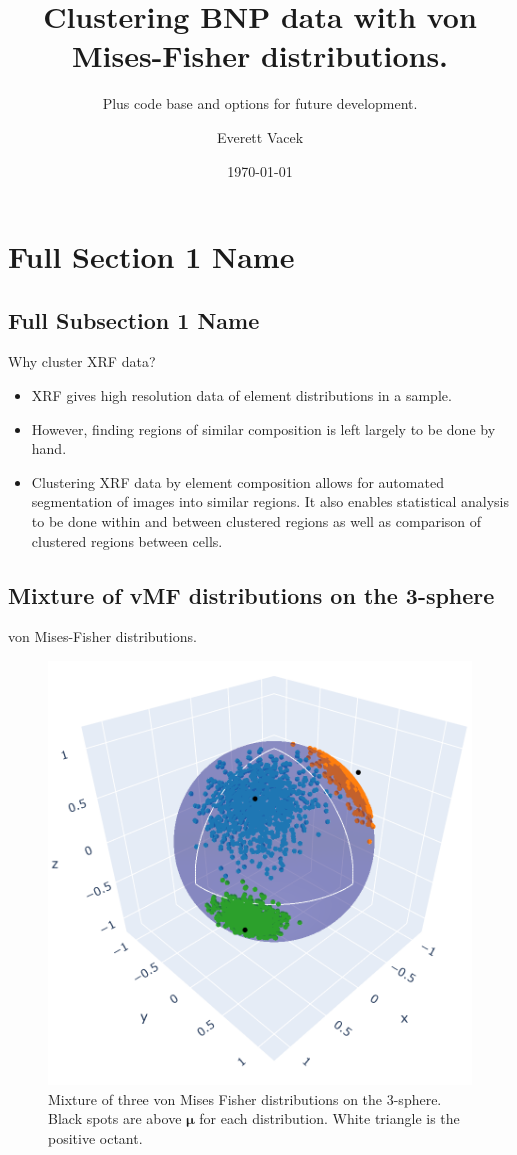 \documentclass[
]{beamer}
\title[Short Presentation Title]{Clustering BNP data with von Mises-Fisher distributions.}
\subtitle[Short Presentation Subtitle]{Plus code base and options for future development.}
\author[E. Vacek]{Everett Vacek}
\date{\today}
\begin{document}
\begin{frame}[plain]
\maketitle
\end{frame}

\section[Short Section 1 Name]{Full Section 1 Name}
\subsection[Short Subsection 1 Name]{Full Subsection 1 Name}

\begin{frame}{Why cluster XRF data?}
    \begin{itemize}
        \item XRF gives high resolution data of element distributions in a sample.
        \item However, finding regions of similar composition is left largely to be done by hand.
        \item Clustering XRF data by element composition allows for automated segmentation of  images into similar regions. It also enables statistical analysis to be done within and between clustered regions as well as comparison of clustered regions between cells.
    \end{itemize}
\end{frame}

\subsection[movMF image]{Mixture of vMF distributions on the 3-sphere}
\begin{frame}{von Mises-Fisher distributions.}
\begin{figure}[h]
  \includegraphics[width=.5\textwidth,height=.5\textheight,keepaspectratio]{vMF.png}
  \caption{Mixture of three von Mises Fisher distributions on the 3-sphere. Black spots are above $\boldsymbol{\mu}$ for each distribution. White triangle is the positive octant.
  }
\end{figure}
\end{frame}
\end{document}
